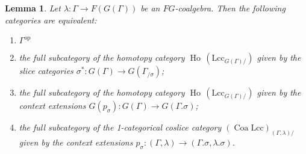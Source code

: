 \documentclass[a4paper]{article}
\newtheorem{lemma}[theorem]{Lemma}
\theoremstyle{remark}
\theoremstyle{definition}
\begin{document}
\begin{lemma}
  \label{lem:cats-of-weak-exts}
  Let $\lambda : \Gamma \rightarrow F(G(\Gamma))$ be an $FG$-coalgebra.
  Then the following categories are equivalent:
  \begin{enumerate}
    \item
      \label{itm:locally-discrete-gamma-op}
      $\Gamma^\mathrm{op}$
    \item
      \label{itm:slice-2-category}
      the full subcategory of the homotopy category $\operatorname{Ho} \, (\mathrm{Lcc}_{G(\Gamma) /})$ given by the slice categories $\sigma^* : G(\Gamma) \rightarrow G(\Gamma_{/ \sigma})$;
    \item
      \label{itm:ext-2-category}
      the full subcategory of the homotopy category $\operatorname{Ho} \, (\mathrm{Lcc}_{G(\Gamma) /})$ given by the context extensions $G(p_\sigma) : G(\Gamma) \rightarrow G(\Gamma.\sigma)$;
    \item
      \label{itm:ext-1-category}
      the full subcategory of the 1-categorical coslice category $(\operatorname{Coa} \mathrm{Lcc})_{(\Gamma, \lambda) /}$ given by the context extensions $p_\sigma : (\Gamma, \lambda) \rightarrow (\Gamma.\sigma, \lambda.\sigma)$.
  \end{enumerate}
\end{lemma}
\end{document}
